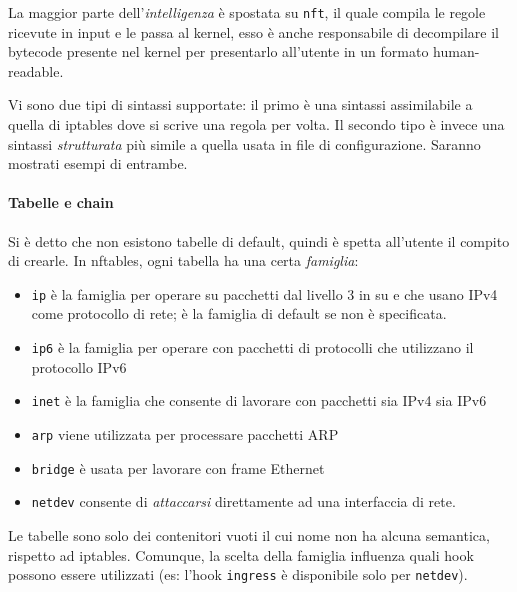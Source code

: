 La maggior parte dell'\textit{intelligenza} è spostata su \texttt{nft}, il quale compila
le regole ricevute in input e le passa al kernel, esso è anche responsabile di
decompilare il bytecode presente nel kernel per presentarlo all'utente in un
formato human-readable.

Vi sono due tipi di sintassi supportate: il primo è una sintassi assimilabile a quella
di iptables dove si scrive una regola per volta. Il secondo tipo è invece
una sintassi \textit{strutturata} più simile a quella usata in
file di configurazione. Saranno mostrati esempi di entrambe.


\paragraph{Tabelle e chain}
Si è detto che non esistono tabelle di default, quindi è spetta all'utente
il compito di crearle. In nftables, ogni tabella ha una certa \textit{famiglia}:
\begin{itemize}
	\item \texttt{ip} è la famiglia per operare su pacchetti dal livello 3 in su e
	      che usano IPv4 come protocollo di rete; è la famiglia di default se non è specificata.
	\item \texttt{ip6} è la famiglia per operare con pacchetti di protocolli che utilizzano
		il protocollo IPv6
	\item \texttt{inet} è la famiglia che consente di lavorare con pacchetti sia IPv4
	      sia IPv6
	\item \texttt{arp} viene utilizzata per processare pacchetti ARP
	\item \texttt{bridge} è usata per lavorare con frame Ethernet
	\item \texttt{netdev} consente di \textit{attaccarsi} direttamente ad una interfaccia
	      di rete.
\end{itemize}
Le tabelle sono solo dei contenitori vuoti il cui nome non ha alcuna semantica, rispetto
ad iptables. Comunque, la scelta della famiglia influenza quali hook possono
essere utilizzati (es: l'hook \texttt{ingress} è disponibile solo per \texttt{netdev}).

